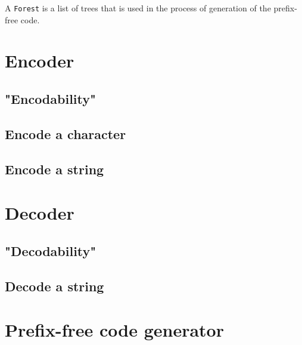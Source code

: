 \documentclass[a4paper,UKenglish,cleveref, autoref, thm-restate]{lipics-v2021}
\begin{document}
A \lstinline{Forest} is a list of trees that is used in the process of generation of the prefix-free code.


\section{Encoder} %

\subsection{"Encodability"}

\subsection{Encode a character}

\subsection{Encode a string}

\section{Decoder} %

\subsection{"Decodability"}

\subsection{Decode a string}

\section{Prefix-free code generator} %
\end{document}
